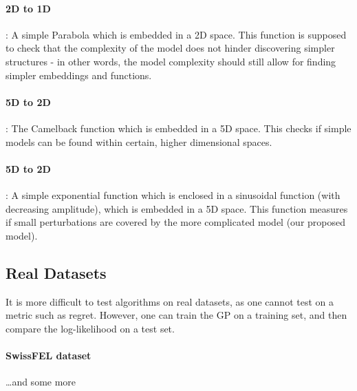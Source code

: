 \paragraph{2D to 1D}: A simple Parabola which is embedded in a 2D space.
This function is supposed to check that the complexity of the model does not hinder discovering simpler structures - in other words, the model complexity should still allow for finding simpler embeddings and functions.
\paragraph{5D to 2D}: The Camelback function which is embedded in a 5D space.
This checks if simple models can be found within certain, higher dimensional spaces.
\paragraph{5D to 2D}: A simple exponential function which is enclosed in a sinusoidal function (with decreasing amplitude), which is embedded in a 5D space.
This function measures if small perturbations are covered by the more complicated model (our proposed model).

\subsection{Real Datasets}
It is more difficult to test algorithms on real datasets, as one cannot test on a metric such as regret.
However, one can train the GP on a training set, and then compare the log-likelihood on a test set.

\paragraph{SwissFEL dataset}
\dots and some more 



